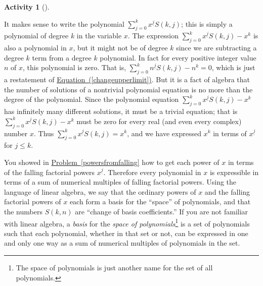 \documentclass[10pt,]{book}
\theoremstyle{plain}
\theoremstyle{definition}
\newtheorem{activity}[project]{Activity}
\numberwithin{equation}{chapter}
\begin{document}
\begin{activity}[]
\begin{equation}
\end{equation}
%
\par
It makes sense to write the polynomial \(\sum_{j=0}^k
x^{\underline{j}}S(k,j)\); this is simply a polynomial of degree \(k\) in the variable \(x\). The expression \(\sum_{j=0}^k
x^{\underline{j}}S(k,j)-x^k\) is also a polynomial in \(x\), but it might not be of degree \(k\) since we are subtracting a degree \(k\) term from a degree \(k\) polynomial. In fact for every positive integer value \(n\) of \(x\), this polynomial is zero. That is, \(\sum_{j=0}^k
n^{\underline{j}}S(k,j)-n^k=0\), which is just a restatement of \hyperref[changeupperlimit]{Equation~(\ref{changeupperlimit})}. But it is a fact of algebra that the number of solutions of a nontrivial polynomial equation is no more than the degree of the polynomial. Since the polynomial equation \(\sum_{j=0}^k x^{\underline{j}}S(k,j)-x^k\) has infinitely many different solutions, it must be a trivial equation; that is \(\sum_{j=0}^k
x^{\underline{j}}S(k,j)-x^k\) must be zero for every real (and even every complex) number \(x\). Thus \(\sum_{j=0}^k
x^{\underline{j}}S(k,j)=x^k\), and we have expressed \(x^k\) in terms of \(x^{\underline{j}}\) for \(j\le k\).%
\end{activity}
You showed in \hyperref[powersfromfalling]{Problem~\ref{powersfromfalling}} how to get each power of \(x\) in terms of the falling factorial powers \(x^{\underline{j}}\). Therefore every polynomial in \(x\) is expressible in terms of a sum of numerical multiples of falling factorial powers. Using the language of linear algebra, we say that the ordinary powers of \(x\) and the falling factorial powers of \(x\) each form a basis for the ``space'' of polynomials, and that the numbers \(S(k,n)\) are ``change of basis coefficients.'' If you are not familiar with linear algebra, a \emph{basis} for the \emph{space of polynomials}\footnote{The space of polynomials is just another name for the set of all polynomials.\label{fn-5}} is a set of polynomials such that each polynomial, whether in that set or not, can be expressed in one and only one way as a sum of numerical multiples of polynomials in the set.%
\end{document}
